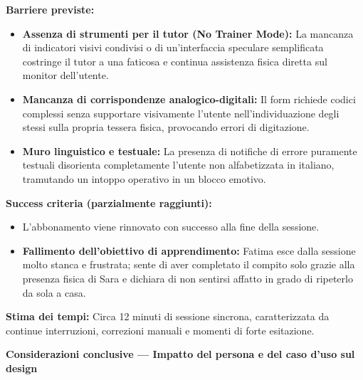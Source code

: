 \documentclass[11pt,a4paper]{article}
\begin{document}
\begin{center}
\begin{tcolorbox}[colback=backgroundColor,colframe=borderColor,arc=2mm]
{    \textbf{Barriere previste:}
    \begin{itemize}
        \item \textbf{Assenza di strumenti per il tutor (No Trainer Mode):} La mancanza di indicatori visivi condivisi o di un'interfaccia speculare semplificata costringe il tutor a una faticosa e continua assistenza fisica diretta sul monitor dell'utente.
        \item \textbf{Mancanza di corrispondenze analogico-digitali:} Il form richiede codici complessi senza supportare visivamente l'utente nell'individuazione degli stessi sulla propria tessera fisica, provocando errori di digitazione.
        \item \textbf{Muro linguistico e testuale:} La presenza di notifiche di errore puramente testuali disorienta completamente l'utente non alfabetizzata in italiano, tramutando un intoppo operativo in un blocco emotivo.
    \end{itemize}

    \textbf{Success criteria (parzialmente raggiunti):}
    \begin{itemize}
        \item L'abbonamento viene rinnovato con successo alla fine della sessione.
        \item \textbf{Fallimento dell'obiettivo di apprendimento:} Fatima esce dalla sessione molto stanca e frustrata; sente di aver completato il compito solo grazie alla presenza fisica di Sara e dichiara di non sentirsi affatto in grado di ripeterlo da sola a casa.
    \end{itemize}

    \textbf{Stima dei tempi:} Circa 12 minuti di sessione sincrona, caratterizzata da continue interruzioni, correzioni manuali e momenti di forte esitazione.
    }
\end{tcolorbox}

\begin{tcolorbox}[colback=primaryColor!10,colframe=primaryColor,arc=2mm]
    \textbf{Considerazioni conclusive --- Impatto del persona e del caso d'uso sul design}
\end{tcolorbox}

\vspace{0.3cm}


\end{center}
\end{document}
